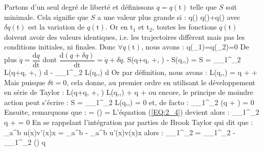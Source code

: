Partons d'un seul degr\'e de libert\'e et d\'efinissons $q=q(\mathrm{t})$ telle que $S$ soit minimale. Cela signifie que $S$ a une valeur plus grande si :
\be
	q() \rightarrow q()+\delta q() \label{EQ:2_2}
\ee
avec $\delta q(\mathrm{t})$ est la variation de $q(\mathrm{t})$. Or en $\mathrm{t}_{1}$ et $\mathrm{t}_{2}$, toutes les fonctions $q(\mathrm{t})$ doivent avoir des valeurs identiques, i.e. les trajectoires diff\`erent mais pas les conditions initiales, ni finales. Donc $\forall q(\mathrm{t})$, nous avons :
\be
	\delta q(_{1})=\delta q(_{2})=0 \label{EQ:2_3}
\ee
De plus $\dot{q}=\dfrac{\mathrm{d}q}{\mathrm{dt}}$ dont $\dfrac{\mathrm{d}(q+\delta q)}{\mathrm{dt}}=\dot{q}+\delta\dot{q}$.
\benn
	S(q+\delta q, +\delta {}, ) - S(q,,) = \delta S = \int_{_{1}}^{_{2}} L(q+\delta q, +\delta {}, ) d - \int_{_{1}}^{_{2}} L(q,,) d
\eenn
Or par d\'efinition, nous avons :
\benn
	\delta L(q,,) = \delta q + \delta {} + \delta {}
\eenn
Mais puisque $\delta \mathrm{t}=0$, cela donne, au premier ordre en utilisant le développement en s\'{e}rie de Taylor :
\benn
	L(q+\delta q, +\delta {}, ) \approx L(q,,) + \delta q + \delta {}
\eenn
ou encore, le principe de moindre action peut s'\'ecrire :
\be
	\delta S = \delta \int_{_{1}}^{_{2}} L(q,,)  = 0 \label{EQ:2_4}
\ee
et, de facto :
\benn
	\bigintsss_{_{1}}^{_{2}} \left(\delta q + \delta {}\right)  = 0
\eenn
Ensuite, remarquons que :
\benn
	\delta {} = \delta\left(\right) = 
\eenn
L'\'equation (\ref{EQ:2_4}) devient alors :
\benn
	\int_{_{1}}^{_{2}} \delta q +  \delta {} = 0
\eenn
En se rappelant l'intégration par parties de Brook Taylor qui dit que :
\benn
	\int_{a}^{b} u(x)v'(x)x = \left[u(x)v(x)\right]_{a}^{b} - \int_{a}^{b} u'(x)v(x)x
\eenn
alors :
\benn
	\int_{_{1}}^{_{2}}  \delta {} = _{_{1}}^{_{2}} - \int_{_{1}}^{_{2}} \left(\right) \delta q
